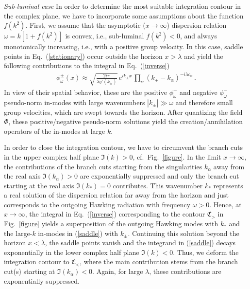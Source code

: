 \documentclass[aps,prl,showpacs,amssymb,nofootinbib,twocolumn]{revtex4}
\newcommand{\bea}{\begin{eqnarray}}
\newcommand{\ea}{\end{eqnarray}}
\begin{document}
{\em Sub-luminal case}\quad
%
In order to determine the most suitable integration contour in the
complex plane, we have to incorporate some assumptions about the
function $f(k^2)$. 
%
First, we assume that the asymptotic ($x\to\infty$) dispersion relation
$\omega=k[1+f(k^2)]$ is convex, i.e., sub-luminal $f(k^2)<0$, and 
always monotonically increasing, i.e., with a positive group velocity.  
%
In this case, saddle points in Eq.~(\ref{stationary}) occur outside
the horizon $x>\lambda$ and 
yield the following contributions to the integral in
Eq.~(\ref{inverse}) 
%
\bea
\label{saddle}
\phi_\omega^\pm(x)\approx\sqrt{\frac{2i\pi}{\lambda g'(k_\pm)}}\,
e^{ik_\pm x}\, 
\prod\limits_\alpha\left(k_\pm-k_\alpha\right)^{-i\lambda c_\alpha}
\,. 
\ea
%
In view of their spatial behavior, these are the positive
$\phi_\omega^+$ and negative $\phi_\omega^-$ pseudo-norm in-modes with
large wavenumbers $|k_\pm|\gg\omega$ and therefore small group
velocities, which are swept towards the horizon.  
%
After quantizing the field $\Phi$, these positive/negative pseudo-norm  
solutions yield the creation/annihilation operators of the in-modes at
large $k$.

In order to close the integration contour, we have to circumvent the
branch cuts in the upper complex half plane $\Im(k)>0$,
cf.~Fig.~\ref{figure}.   
%
In the limit $x\to\infty$, the contributions of the branch cuts
starting from the singularities $k_\alpha$ away from the real axis
$\Im(k_\alpha)>0$ are exponentially suppressed and only the branch cut
starting at the real axis $\Im(k_*)=0$ contributes. 
%
This wavenumber $k_*$ represents a real solution of the dispersion
relation far away from the horizon and just corresponds to the
outgoing Hawking radiation with frequency $\omega>0$. 
%
Hence, at $x\to\infty$, the integral in Eq.~(\ref{inverse})
corresponding to the contour ${\mathfrak C}_>$ in Fig.~\ref{figure} 
yields a superposition of the outgoing Hawking modes with $k_*$ and
the large-$k$ in-modes in (\ref{saddle}) with $k_\pm$. 
%
Continuing this solution beyond the horizon $x<\lambda$, the saddle
points vanish and the integrand in (\ref{saddle}) decays exponentially
in the lower complex half plane $\Im(k)<0$. 
%
Thus, we deform the integration contour to ${\mathfrak C}_<$, where
the main contribution stems from the branch cut(s) starting at 
$\Im(k_\alpha)<0$. 
%
Again, for large $\lambda$, these contributions are exponentially
suppressed.  
\end{document}
